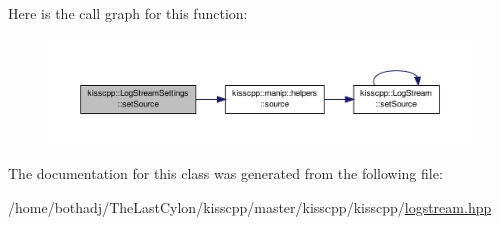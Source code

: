 Here is the call graph for this function\-:
\nopagebreak
\begin{figure}[H]
\begin{center}
\leavevmode
\includegraphics[width=350pt]{classkisscpp_1_1_log_stream_settings_ac370b7ef8b02c76c2f0ddb7f9d2e1930_cgraph}
\end{center}
\end{figure}




The documentation for this class was generated from the following file\-:\begin{DoxyCompactItemize}
\item 
/home/bothadj/\-The\-Last\-Cylon/kisscpp/master/kisscpp/kisscpp/\hyperlink{logstream_8hpp}{logstream.\-hpp}\end{DoxyCompactItemize}
